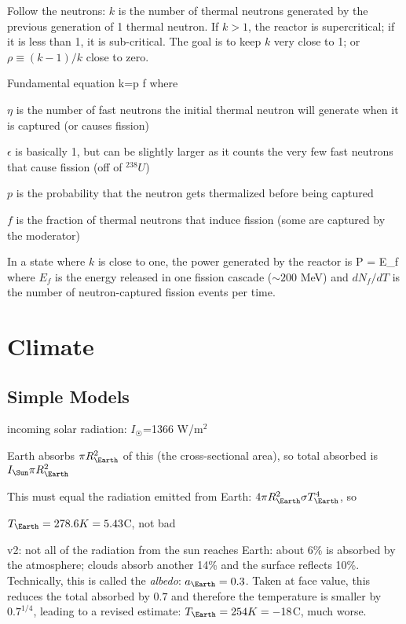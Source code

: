 \documentclass[11pt]{book}
\begin{document}
Follow the neutrons: $k$ is the number of thermal neutrons generated by the previous generation of 1 thermal neutron. If $k>1$, the reactor is supercritical; if it is less than 1, it is sub-critical. The goal is to keep $k$ very close to 1; or $\rho\equiv (k-1)/k$ close to zero.

Fundamental equation
\be
k=\eta\epsilon p f
\ee
where
\bei
\item $\eta$ is the number of fast neutrons the initial thermal neutron will generate when it is captured (or causes fission)
\item $\epsilon$ is basically 1, but can be slightly larger as it counts the very few fast neutrons that cause fission (off of $^{238}U$)
\item $p$ is the probability that the neutron gets thermalized before being captured 
\item $f$ is the fraction of thermal neutrons that induce fission (some are captured by the moderator)
\eei

In a state where $k$ is close to one, the power generated by the reactor is
\be
P = E_f 
\ee
where $E_f$ is the energy released in one fission cascade ($\sim200$ MeV) and $dN_f/dT$ is the number of neutron-captured fission events per time. 


\chapter{Climate}

\section{Simple Models}

\bei
\item incoming solar radiation: $I_\Sun$=1366 W/m$^2$
\item Earth absorbs $\pi R_\Earth^2$ of this (the cross-sectional area), so total absorbed is $I_\Sun \pi R_\Earth^2$
\item This must equal the radiation emitted from Earth: $4\pi R_\Earth^2 \sigma T_\Earth^4$, so
\item $T_\Earth=278.6K=5.43$C, not bad
\eei 

v2: not all of the radiation from the sun reaches Earth: about 6\% is absorbed by the atmosphere; clouds absorb another 14\% and the surface reflects 10\%. Technically, this is called the {\it albedo}: $a_\Earth=0.3$. Taken at face value, this reduces the total absorbed by $0.7$ and therefore the temperature is smaller by $0.7^{1/4}$, leading to a revised estimate: $T_\Earth=254K=-18$C, much worse.
\end{document}
